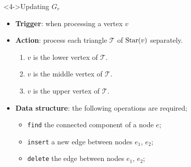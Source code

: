 \begin{frame*}
\begin{columns}[T,onlytextwidth]
\end{columns}
\begin{block}<4->{Updating $G_r$}
\begin{itemize}
\item<5-> \textbf{Trigger}:  when processing a vertex $v$\\
\item<6-> \textbf{Action}: process each triangle $\mathcal{T}$ of $\operatorname{Star}(v)$ separately.
\begin{enumerate}
\item<7-> $v$ is the lower vertex of $\mathcal{T}$.
\item<8-> $v$ is the middle vertex of $\mathcal{T}$.
\item<9-> $v$ is the upper vertex of $\mathcal{T}$.
\end{enumerate}
\item<10-> \textbf{Data structure}: the following operations are required;
\begin{itemize}
\item<11-> \texttt{find} the connected component of a node $e$;
\item<12-> \texttt{insert} a new edge between nodes $e_1$, $e_2$;
\item<13-> \texttt{delete} the edge between nodes $e_1$, $e_2$;
\end{itemize}
\end{itemize}
\end{block}
\end{frame*}



